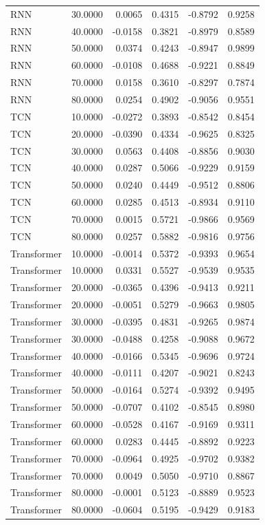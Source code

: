 \begin{tabular}{lrrrrr}
RNN & 30.0000 & 0.0065 & 0.4315 & -0.8792 & 0.9258 \\
RNN & 40.0000 & -0.0158 & 0.3821 & -0.8979 & 0.8589 \\
RNN & 50.0000 & 0.0374 & 0.4243 & -0.8947 & 0.9899 \\
RNN & 60.0000 & -0.0108 & 0.4688 & -0.9221 & 0.8849 \\
RNN & 70.0000 & 0.0158 & 0.3610 & -0.8297 & 0.7874 \\
RNN & 80.0000 & 0.0254 & 0.4902 & -0.9056 & 0.9551 \\
TCN & 10.0000 & -0.0272 & 0.3893 & -0.8542 & 0.8454 \\
TCN & 20.0000 & -0.0390 & 0.4334 & -0.9625 & 0.8325 \\
TCN & 30.0000 & 0.0563 & 0.4408 & -0.8856 & 0.9030 \\
TCN & 40.0000 & 0.0287 & 0.5066 & -0.9229 & 0.9159 \\
TCN & 50.0000 & 0.0240 & 0.4449 & -0.9512 & 0.8806 \\
TCN & 60.0000 & 0.0285 & 0.4513 & -0.8934 & 0.9110 \\
TCN & 70.0000 & 0.0015 & 0.5721 & -0.9866 & 0.9569 \\
TCN & 80.0000 & 0.0257 & 0.5882 & -0.9816 & 0.9756 \\
Transformer & 10.0000 & -0.0014 & 0.5372 & -0.9393 & 0.9654 \\
Transformer & 10.0000 & 0.0331 & 0.5527 & -0.9539 & 0.9535 \\
Transformer & 20.0000 & -0.0365 & 0.4396 & -0.9413 & 0.9211 \\
Transformer & 20.0000 & -0.0051 & 0.5279 & -0.9663 & 0.9805 \\
Transformer & 30.0000 & -0.0395 & 0.4831 & -0.9265 & 0.9874 \\
Transformer & 30.0000 & -0.0488 & 0.4258 & -0.9088 & 0.9672 \\
Transformer & 40.0000 & -0.0166 & 0.5345 & -0.9696 & 0.9724 \\
Transformer & 40.0000 & -0.0111 & 0.4207 & -0.9021 & 0.8243 \\
Transformer & 50.0000 & -0.0164 & 0.5274 & -0.9392 & 0.9495 \\
Transformer & 50.0000 & -0.0707 & 0.4102 & -0.8545 & 0.8980 \\
Transformer & 60.0000 & -0.0528 & 0.4167 & -0.9169 & 0.9311 \\
Transformer & 60.0000 & 0.0283 & 0.4445 & -0.8892 & 0.9223 \\
Transformer & 70.0000 & -0.0964 & 0.4925 & -0.9702 & 0.9382 \\
Transformer & 70.0000 & 0.0049 & 0.5050 & -0.9710 & 0.8867 \\
Transformer & 80.0000 & -0.0001 & 0.5123 & -0.8889 & 0.9523 \\
Transformer & 80.0000 & -0.0604 & 0.5195 & -0.9429 & 0.9183 \\
\bottomrule
\end{tabular}
